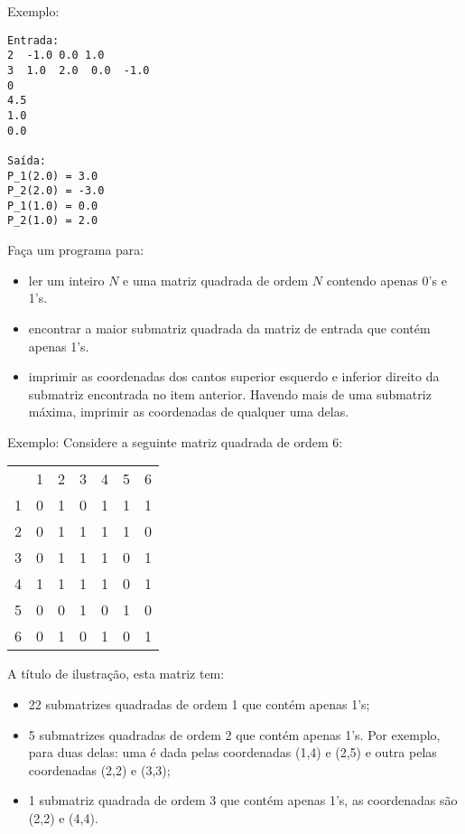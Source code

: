 Exemplo:
\begin{verbatim}
Entrada:
2  -1.0 0.0 1.0
3  1.0  2.0  0.0  -1.0
0
4.5
1.0
0.0

Saída:
P_1(2.0) = 3.0
P_2(2.0) = -3.0
P_1(1.0) = 0.0
P_2(1.0) = 2.0
\end{verbatim}


\item Faça um programa para:

\begin{itemize}
\item ler um inteiro $N$ e uma matriz quadrada de ordem $N$ contendo apenas
      0's e 1's.
\item encontrar a maior submatriz quadrada da matriz de entrada
      que contém apenas 1's.
\item imprimir as coordenadas dos cantos superior esquerdo e
      inferior direito da submatriz encontrada no item anterior. Havendo mais 
      de uma submatriz máxima, imprimir as coordenadas de qualquer uma delas.
\end{itemize}


\noindent Exemplo: Considere a seguinte matriz quadrada de 
ordem 6:

\vspace*{\baselineskip}

\begin{center}
\begin{tabular}{c|c|c|c|c|c|c|}
\multicolumn{1}{c}{}  & \multicolumn{1}{c}{1} & \multicolumn{1}{c}{2} & \multicolumn{1}{c}{3} & \multicolumn{1}{c}{4} & \multicolumn{1}{c}{5} & \multicolumn{1}{c}{6} \\ \cline{2-7}
1 & 0 & 1 & 0 & 1 & 1 & 1 \\ \cline{2-7}
2 & 0 & 1 & 1 & 1 & 1 & 0 \\ \cline{2-7}
3 & 0 & 1 & 1 & 1 & 0 & 1 \\ \cline{2-7}
4 & 1 & 1 & 1 & 1 & 0 & 1 \\ \cline{2-7}
5 & 0 & 0 & 1 & 0 & 1 & 0 \\ \cline{2-7}
6 & 0 & 1 & 0 & 1 & 0 & 1 \\ \cline{2-7}
\end{tabular}
\end{center}

\vspace*{\baselineskip}

A título de ilustração, esta matriz tem:

\begin{itemize}
\item 22 submatrizes quadradas de ordem 1 que contém apenas 1's;
\item 5 submatrizes quadradas de ordem 2 que contém apenas 1's. Por exemplo, 
      para duas delas: uma é dada pelas coordenadas (1,4) e (2,5) e outra 
      pelas coordenadas (2,2) e (3,3);
\item 1 submatriz quadrada de ordem 3 que contém apenas 1's, as coordenadas são (2,2) e (4,4).
\end{itemize}


